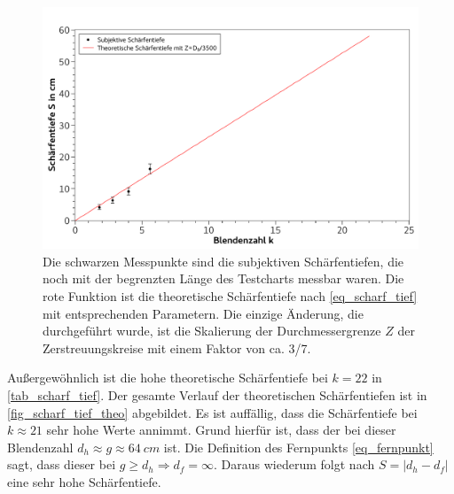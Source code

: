 \documentclass[
	a4paper,
	12pt,
	pagesize,
	ngerman
]{scrartcl}
\begin{document}
	\begin{figure}[H]  %
		\includegraphics[width=1\textwidth]{fig_scharf_tief}
		\centering
		\caption{Die schwarzen Messpunkte sind die subjektiven Schärfentiefen, die noch mit der begrenzten Länge des Testcharts messbar waren.
			Die rote Funktion ist die theoretische Schärfentiefe nach \cref{eq_scharf_tief} mit entsprechenden Parametern.
			Die einzige Änderung, die durchgeführt wurde, ist die Skalierung der Durchmessergrenze $Z$ der Zerstreuungskreise mit einem Faktor von ca. 3/7.}
		\label{fig_scharf_tief}
		\centering
	\end{figure}

	Außergewöhnlich ist die hohe theoretische Schärfentiefe bei $k=22$ in \cref{tab_scharf_tief}.
	Der gesamte Verlauf der theoretischen Schärfentiefen ist in \cref{fig_scharf_tief_theo} abgebildet.
	Es ist auffällig, dass die Schärfentiefe bei $k\approx21$ sehr hohe Werte annimmt.
	Grund hierfür ist, dass der bei dieser Blendenzahl $d_h\approx g\approx\SI{64}{cm}$ ist.
	Die Definition des Fernpunkts \cref{eq_fernpunkt} sagt, dass dieser bei $g\geq d_h \Rightarrow d_f=\infty$.
	Daraus wiederum folgt nach $S=|d_h-d_f|$ eine sehr hohe Schärfentiefe.
\end{document}
